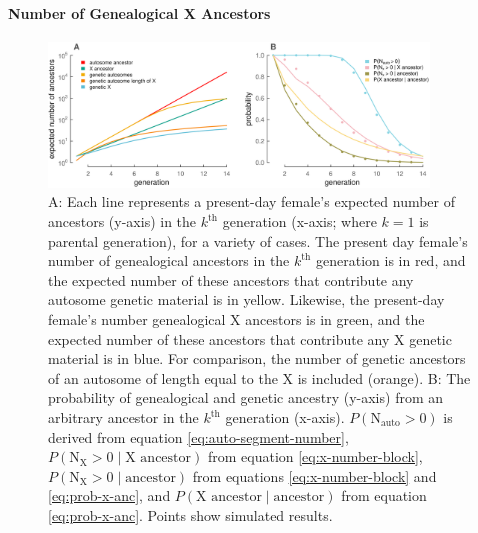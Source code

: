 \documentclass[9pt,twocolumn,twoside]{gsajnl}
\begin{document}
\paragraph{Number of Genealogical X Ancestors}

  \begin{figure}[!ht]
    \centering
    \includegraphics[width=0.9\textwidth]{images/num-ancestors}

    \caption{A: Each line represents a present-day female's expected number of
      ancestors (y-axis) in the $k^\text{th}$ generation (x-axis; where $k=1$
      is parental generation), for a variety of cases. The present day female's
      number of genealogical ancestors in the $k^\text{th}$ generation is in
      red, and the expected number of these ancestors that contribute any
      autosome genetic material is in yellow. Likewise, the present-day
      female's number genealogical X ancestors is in green, and the expected
      number of these ancestors that contribute any X genetic material is in
      blue. For comparison, the number of genetic ancestors of an autosome of
      length equal to the X is included (orange). B: The probability of
      genealogical and genetic ancestry (y-axis) from an arbitrary ancestor in
      the $k^\text{th}$ generation (x-axis). $P(\text{N}_\text{auto} > 0)$ is
      derived from equation \eqref{eq:auto-segment-number},
      $P(\text{N}_\text{X} > 0 \;|\; \text{X ancestor})$ from equation
      \eqref{eq:x-number-block}, $P(\text{N}_\text{X} > 0 \;|\;
      \text{ancestor})$ from equations \eqref{eq:x-number-block} and
    \eqref{eq:prob-x-anc}, and $P(\text{X ancestor} \;|\; \text{ancestor})$
  from equation \eqref{eq:prob-x-anc}. Points show simulated results.}

\label{fig:num-ancestors}
\end{figure}
\end{document}
